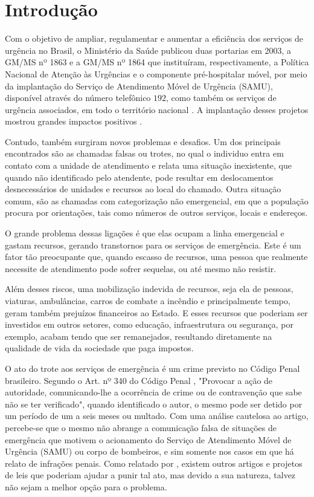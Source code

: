 \chapter{Introdução}
Com o objetivo de ampliar, regulamentar e aumentar a eficiência dos serviços de urgência no Brasil, o Ministério da Saúde publicou duas portarias em 2003, a GM/MS nº 1863 e a GM/MS nº 1864 que instituíram, respectivamente, a Política Nacional de Atenção às Urgências e o componente pré-hospitalar móvel, por meio da implantação do Serviço de Atendimento Móvel de Urgência (SAMU), disponível através do número telefônico $192$, como também os serviços de urgência associados, em todo o território nacional \citep{p1863, p1864}. A implantação desses projetos mostrou grandes impactos positivos \citep{VIEIRA2008, MACHADO2011, MINAYO2008}. 

Contudo, também surgiram novos problemas e desafios. Um dos principais encontrados são as chamadas falsas ou trotes, no qual o individuo entra em contato com a unidade de atendimento e relata uma situação inexistente, que quando não identificado pelo atendente, pode resultar em deslocamentos desnecessários de unidades e recursos ao local do chamado. Outra situação comum, são as chamadas com categorização não emergencial, em que a população procura por orientações, tais como números de outros serviços, locais e endereços. 

O grande problema dessas ligações é que elas ocupam a linha emergencial e gastam recursos, gerando transtornos para os serviços de emergência. Este é um fator tão preocupante que, quando escasso de recursos, uma pessoa que realmente necessite de atendimento pode sofrer sequelas, ou até mesmo não resistir.

Além desses riscos, uma mobilização indevida de recursos, seja ela de pessoas, viaturas, ambulâncias, carros de combate a incêndio e principalmente tempo, geram também prejuízos financeiros ao Estado. E esses recursos que poderiam ser investidos em outros setores, como educação, infraestrutura ou segurança, por exemplo, acabam tendo que ser remanejados, resultando diretamente na qualidade de vida da sociedade que paga impostos.

O ato do trote aos serviços de emergência é um crime previsto no Código Penal brasileiro. Segundo o Art. nº 340 do Código Penal \citep{cp340}, "Provocar a ação de autoridade, comunicando-lhe a ocorrência de crime ou de contravenção que sabe não se ter verificado", quando identificado o autor, o mesmo pode ser detido por um período de um a seis meses ou multado. Com uma análise cautelosa ao artigo, percebe-se que o mesmo não abrange a comunicação falsa de situações de emergência que motivem o acionamento do Serviço de Atendimento Móvel de Urgência (SAMU) ou corpo de bombeiros, e sim somente nos casos em que há relato de infrações penais. Como relatado por \cite{peixoto2015combate}, existem outros artigos e projetos de leis que poderiam ajudar a punir tal ato, mas devido a sua natureza, talvez não sejam a melhor opção para o problema. 

